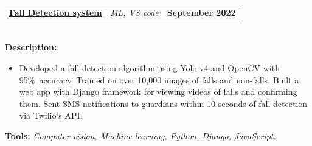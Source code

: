 \documentclass[letterpaper,11pt]{article}
\makeatletter
\newcommand{\resumeItem}[1]{
  \item\small{
    {#1 \vspace{-2pt}}
  }
}
\newcommand{\resumeProjectHeading}[2]{
    \item
    \begin{tabular*}{1.001\textwidth}{l@{\extracolsep{\fill}}r}
      \small#1 & \textbf{\small #2}\\
    \end{tabular*}\vspace{-7pt}
}
\newcommand{\resumeItemListStart}{\begin{itemize}}
\newcommand{\resumeItemListEnd}{\end{itemize}\vspace{-5pt}}
\makeatother
\begin{document}
                

          \resumeProjectHeading          {\textbf{\href{https://github.com/yakkshit/Fall-Detection-Via-Camera-2D.git}{Fall Detection system}} $|$ \emph{ML, VS code \faGithub}}{September 2022}\\
          \vspace{6pt}
          \textbf{Description:}
         
          \vspace{-8pt}
          \resumeItemListStart
          \resumeItem{Developed a fall detection algorithm using Yolo v4 and OpenCV with 95\%\ accuracy. Trained on over 10,000 images of falls and non-falls. Built a web app with Django framework for viewing videos of falls and confirming them. Sent SMS notifications to guardians within 10 seconds of fall detection via Twilio's API.}
          \resumeItemListEnd 
          \textbf{Tools:}\emph{
Computer vision, Machine learning, Python, Django, JavaScript.}


                
\end{document}
